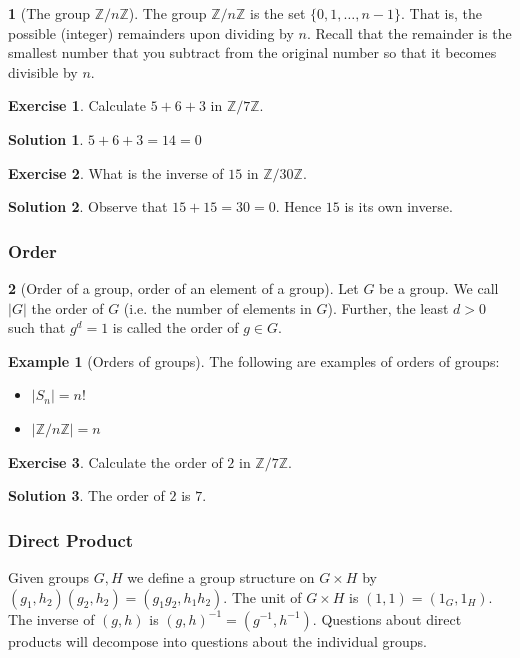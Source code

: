 \documentclass[12pt]{article}
\theoremstyle{definition}
\newtheorem{definition}{\color{NavyBlue}{\textbf{Definition}}}
\newtheorem{example}{\color{WildStrawberry}Example}
\newtheorem{exercise}{\color{YellowOrange}Exercise}
\theoremstyle{definition}
\newtheorem{solution}{\color{Goldenrod}Solution}
\begin{document}
\begin{definition}[The group $\mathbb{Z} / n \mathbb{Z}$]
The group $\mathbb{Z} / n \mathbb{Z}$ is the set $\{0,1,\ldots,n-1\}$. That is, the possible (integer) remainders upon dividing by $n$. Recall that the remainder is the smallest number that you subtract from the original number so that it becomes divisible by $n$. 
\end{definition}
\begin{exercise}
Calculate $5 + 6 + 3$ in $\mathbb{Z} / 7 \mathbb{Z}$.
\end{exercise}
\begin{solution}
$5 + 6+ 3 = 14 = 0$
\end{solution}
\begin{exercise}
What is the inverse of $15$ in $\mathbb{Z} / 30 \mathbb{Z}$.
\end{exercise}
\begin{solution}
Observe that $15 + 15 = 30 = 0$. Hence $15$ is its own inverse.
\end{solution}

\subsubsection{Order}

\begin{definition}[Order of a group, order of an element of a group]
Let $G$ be a group. We call $|G|$ the order of $G$ (i.e. the number of elements in $G$). Further, the least $d >0$ such that $g^d = 1$ is called the order of $g \in G$.
\end{definition}
\begin{example}[Orders of groups] The following are examples of orders of groups:
\begin{itemize} 
\item $|S_n| = n!$
\item $|\mathbb{Z} / n \mathbb{Z}| = n$
\end{itemize}
\end{example}

\begin{exercise}
Calculate the order of $2$ in $\mathbb{Z} / 7 \mathbb{Z}$.
\end{exercise}
\begin{solution}
The order of $2$ is $7$.
\end{solution}

\subsubsection{Direct Product}
Given groups $G, H$ we define a group structure on $G \times H$ by $(g_1,h_2)(g_2,h_2) = (g_1g_2,h_1h_2)$. The unit of $G \times H$ is $(1,1) = (1_G, 1_H)$. The inverse of $(g,h)$ is $(g,h)^{-1} = (g^{-1}, h^{-1})$. Questions about direct products will decompose into questions about the individual groups. 
\end{document}
